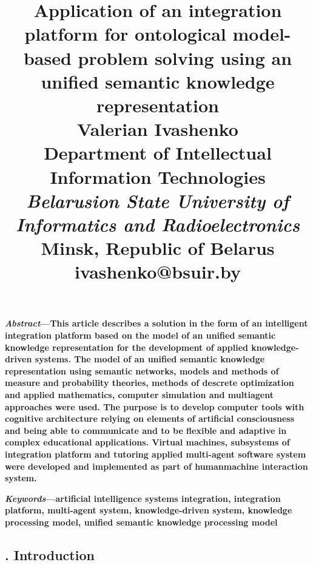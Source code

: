 \documentclass[10pt,twocolumn]{article}
\title{\huge\textbf{ Application of an integration platform for ontological 
model-based problem solving using
an unified semantic knowledge representation}\\\vspace{1em}
\large Valerian Ivashenko\\\small{Department of Intellectual Information Technologies}\\\textit{Belarusion State University of Informatics and Radioelectronics}\\Minsk, Republic of Belarus\\ivashenko@bsuir.by\vspace{-3em}}
\date{}
\newcommand{\RomanNumeralCaps}[1]
    {\MakeUppercase{\romannumeral #1}}
\begin{document}
\maketitle
\textbf{\small {\textit {Abstract}—This article describes a solution in the form
of an intelligent integration platform based on the model
of an unified semantic knowledge representation for the
development of applied knowledge-driven systems. The
model of an unified semantic knowledge representation
using semantic networks, models and methods of measure
and probability theories, methods of descrete optimization
and applied mathematics, computer simulation and multiagent approaches were used. The purpose is to develop computer tools with cognitive architecture relying on elements
of artificial consciousness and being able to communicate
and to be flexible and adaptive in complex educational
applications. Virtual machines, subsystems of integration
platform and tutoring applied multi-agent software system were developed and implemented as part of humanmachine interaction system.}}


\textbf{\small{\textit{Keywords}—artificial intelligence systems integration, integration platform, multi-agent system, knowledge-driven
system, knowledge processing model, unified semantic
knowledge processing model}\vspace{-0.7em}}

\begin{center}
\section*{\large\textmd{{\RomanNumeralCaps{1.}  Introduction}}}
\end{center}
\end{document}
